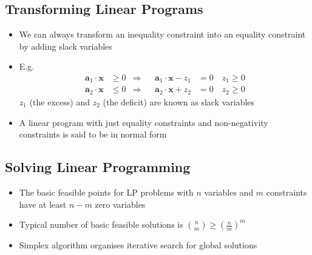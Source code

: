 
\begin{slide}
\section{Transforming Linear Programs}

\begin{PauseHighLight}
  \begin{itemize}
  \item We can always transform an inequality constraint into an
    equality constraint by adding slack variables
  \item E.g.
    \begin{align*}
      \bm{a}_1\cdot\bm{x} &\geq 0 &\Rightarrow& &
      \bm{a}_1\cdot\bm{x} - z_1 &=0 \quad z_1 \geq 0 \\ 
      \bm{a}_2\cdot\bm{x} &\leq 0 &\Rightarrow& &
      \bm{a}_2\cdot\bm{x} + z_2 &=0 \quad z_2 \geq 0
    \end{align*}
    $z_1$ (the excess) and $z_2$ (the deficit) are known as slack
    variables\pause
  \item A linear program with just equality constraints and
    non-negativity constraints is said to be in
    normal form\pause
  \end{itemize}
\end{PauseHighLight}

\end{slide}


\begin{slide}
\section[-2]{Solving Linear Programming}

\pb\pause {}
\begin{minipage}{0.5\linewidth}
\begin{center}
  \pause
\end{center}  
\end{minipage}\hfil
\begin{minipage}{0.45\linewidth}
  \begin{itemize}
  \item The basic feasible points for LP problems with $n$ variables and
    $m$ constraints have at least $n-m$ zero variables\pause
  \item Typical number of basic feasible solutions is
    $\binom{n}{m}\geq\left(\frac{n}{m}\right)^m$\pause
  \item Simplex algorithm organises iterative search for global solutions\pause
  \end{itemize}
\end{minipage}

\end{slide}


